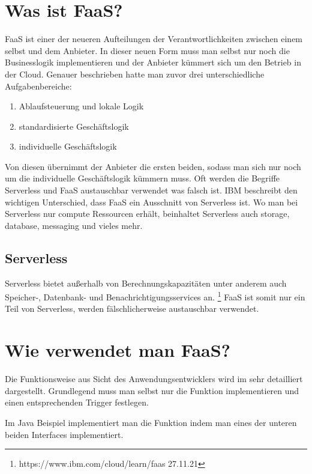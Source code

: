 \documentclass[12pt, a4paper]{article}
\begin{document}
\section{Was ist \ac{FaaS}?}
\ac{FaaS} ist einer der neueren Aufteilungen der Verantwortlichkeiten zwischen einem selbst und dem Anbieter.
In dieser neuen Form muss man selbst nur noch die Businesslogik implementieren und der Anbieter kümmert sich um den Betrieb in der Cloud.
Genauer beschrieben hatte man zuvor drei unterschiedliche Aufgabenbereiche\cite{serverless2017roewekamp}:
\begin{enumerate}
    \item Ablaufsteuerung und lokale Logik
    \item standardisierte Geschäftslogik
    \item individuelle Geschäftslogik
\end{enumerate}
Von diesen übernimmt der Anbieter die ersten beiden, sodass man sich nur noch um die individuelle Geschäftslogik kümmern muss. 
\newline
Oft werden die Begriffe Serverless und \ac{FaaS} austauschbar verwendet was falsch ist.
IBM beschreibt den wichtigen Unterschied, dass \ac{FaaS} ein Ausschnitt von Serverless ist\cite{faas2019ibm}.
Wo man bei Serverless nur compute Ressourcen erhält, beinhaltet Serverless auch storage, database, messaging und vieles mehr.

\subsection{Serverless}
Serverless bietet außerhalb von Berechnungskapazitäten unter anderem auch Speicher-, Datenbank- und Benachrichtigungsservices an. \footnote{https://www.ibm.com/cloud/learn/faas 27.11.21}
FaaS ist somit nur ein Teil von Serverless, werden fälschlicherweise austauschbar verwendet.


\section{Wie verwendet man \ac{FaaS}?}
Die Funktionsweise aus Sicht des Anwendungsentwicklers wird im \cite[Developer Guide von \ac{AWS}]{awsLambda_devGuide} sehr detailliert dargestellt.
Grundlegend muss man selbst nur die Funktion implementieren und einen entsprechenden Trigger festlegen.

Im Java Beispiel implementiert man die Funktion indem man eines der unteren beiden Interfaces implementiert.
\end{document}
